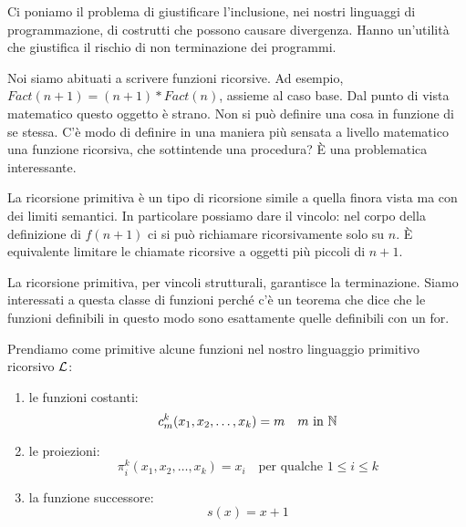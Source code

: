Ci poniamo il problema di giustificare l'inclusione, nei nostri linguaggi di programmazione, di
costrutti che possono causare divergenza. Hanno un'utilità che giustifica il rischio di non
terminazione dei programmi.

Noi siamo abituati a scrivere funzioni ricorsive. Ad esempio, $\textit{Fact}(n+1) =
(n+1)*\textit{Fact}(n)$, assieme al caso base. Dal punto di vista matematico questo oggetto è
strano. Non si può definire una cosa in funzione di se stessa. C'è modo di definire in una maniera
più sensata a livello matematico una funzione ricorsiva, che sottintende una procedura? È una
problematica interessante.

La ricorsione primitiva è un tipo di ricorsione simile a quella finora vista ma con dei limiti
semantici. In particolare possiamo dare il vincolo: nel corpo della definizione di $f(n+1)$ ci si
può richiamare ricorsivamente solo su $n$.  È equivalente limitare le chiamate ricorsive a oggetti
più piccoli di $n+1$.

La ricorsione primitiva, per vincoli strutturali, garantisce la terminazione. Siamo interessati a
questa classe di funzioni perché c'è un teorema che dice che le funzioni definibili in questo modo
sono esattamente quelle definibili con un for.

Prendiamo come primitive alcune funzioni nel nostro linguaggio primitivo ricorsivo $\mathcal{L}$:
\begin{enumerate}
    \item le funzioni costanti:
        \begin{equation*}
            c^{k}_{m}(x_{1},x_{2},\dotsc,x_{k}) = m \quad \text{$m$ in $\mathbb{N}$}
        \end{equation*}
    \item le proiezioni:
        \begin{equation*}
            \pi_{i}^{k}(x_{1},x_{2},\dotsc,x_{k}) = x_{i} \quad \text{per qualche $1 \leq i \leq k$}
        \end{equation*}
    \item la funzione successore:
        \begin{equation*}
            s(x) = x + 1
        \end{equation*}
\end{enumerate}

